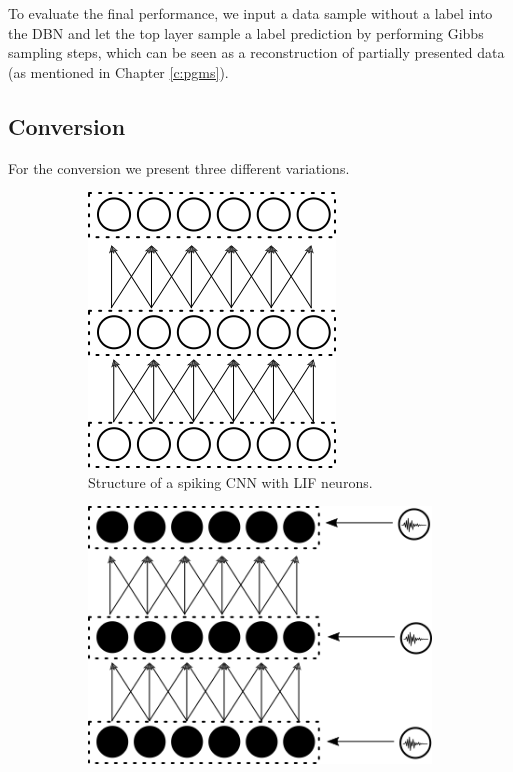 To evaluate the final performance, we input a data sample without a label into the DBN and let the top layer sample a label prediction by performing Gibbs sampling steps, which can be seen as a reconstruction of partially presented data (as mentioned in Chapter \ref{c:pgms}).


\subsection{Conversion} \label{c:conversionappr}

For the conversion we present three different variations.

\begin{figure}
	\centering
	\begin{subfigure}[t]{.5\textwidth}
  		\centering
  		\includegraphics[width=.6\linewidth]{imgs/convert_cnn.png}
  		\caption{Structure of a spiking CNN with LIF neurons.}
  		\label{fig:converted1}
	\end{subfigure}%
	\begin{subfigure}[t]{.5\textwidth}
  		\centering
  		\includegraphics[width=.8\linewidth]{imgs/convert_dbn.png}

\end{subfigure}
\end{figure}
